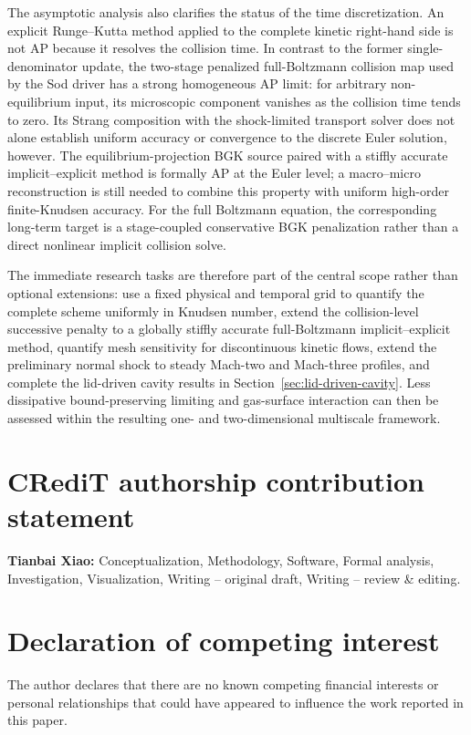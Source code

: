 \documentclass[preprint,3p,12pt]{elsarticle}
\begin{document}
The asymptotic analysis also clarifies the status of the time discretization. An explicit Runge--Kutta method applied to the complete kinetic right-hand side is not AP because it resolves the collision time. In contrast to the former single-denominator update, the two-stage penalized full-Boltzmann collision map used by the Sod driver has a strong homogeneous AP limit: for arbitrary non-equilibrium input, its microscopic component vanishes as the collision time tends to zero. Its Strang composition with the shock-limited transport solver does not alone establish uniform accuracy or convergence to the discrete Euler solution, however. The equilibrium-projection BGK source paired with a stiffly accurate implicit--explicit method is formally AP at the Euler level; a macro--micro reconstruction is still needed to combine this property with uniform high-order finite-Knudsen accuracy. For the full Boltzmann equation, the corresponding long-term target is a stage-coupled conservative BGK penalization rather than a direct nonlinear implicit collision solve.

The immediate research tasks are therefore part of the central scope rather than optional extensions: use a fixed physical and temporal grid to quantify the complete scheme uniformly in Knudsen number, extend the collision-level successive penalty to a globally stiffly accurate full-Boltzmann implicit--explicit method, quantify mesh sensitivity for discontinuous kinetic flows, extend the preliminary normal shock to steady Mach-two and Mach-three profiles, and complete the lid-driven cavity results in Section~\ref{sec:lid-driven-cavity}. Less dissipative bound-preserving limiting and gas-surface interaction can then be assessed within the resulting one- and two-dimensional multiscale framework.

\section*{CRediT authorship contribution statement}

\textbf{Tianbai Xiao:} Conceptualization, Methodology, Software, Formal analysis, Investigation, Visualization, Writing -- original draft, Writing -- review \& editing.

\section*{Declaration of competing interest}

The author declares that there are no known competing financial interests or personal relationships that could have appeared to influence the work reported in this paper.
\end{document}
